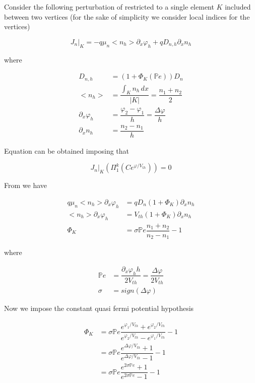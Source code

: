 Consider  the following perturbation of  restricted to a single element $K$ included between two vertices (for the sake of simplicity we consider local indices for the vertices)

\begin{equation}
\label{eq: j element 1d perturbata}
J_n|_K = -q\mu_n <n_h> \partial_x \varphi_h + qD_{n,h} \partial_x n_h
\end{equation}
 
 where 

\begin{align*}
D_{n,h} & = (1+\Phi_K(\mathbb{P}e))D_n \\
<n_h> & = \dfrac{\int_K n_h \, dx}{|K|} = \dfrac{n_1+n_2}{2} \\
\partial_x \varphi_h & = \dfrac{\varphi_2-\varphi_1}{h} = \dfrac{\Delta \varphi}{h}\\
\partial_x n_h & = \dfrac{n_2 - n_1}{h}
\end{align*}

Equation  can be obtained imposing that

\begin{equation}
J_n|_K(\Pi_1^k(Ce^{\varphi / V_{th}})) = 0 
\end{equation}

From  we have

\begin{align*}
q\mu_n <n_h>\partial_x \varphi_h & = q D_ n(1+\Phi_K)\partial_x n_h \\
<n_h>\partial_x \varphi_h & = V_{th}(1+\Phi_K)\partial_x n_h \\
\Phi_K & = \sigma \mathbb{P}e \dfrac{n_1+n_2}{n_2-n_1}  -1
\end{align*}

where 

\begin{align*}
\mathbb{P}e & = \dfrac{\partial_x \varphi_h h}{2V_{th}}  = \dfrac{\Delta \varphi }{2 V_{th}} \\
\sigma & = sign(\Delta \varphi)
\end{align*}


Now we impose the constant quasi fermi potential hypothesis

\begin{align*}
\Phi_K & = \sigma \mathbb{P}e \dfrac{e^{\varphi_1/V_{th}}+e^{\varphi_2/V_{th}}}{e^{\varphi_2/V_{th}}-e^{\varphi_1/V_{th}}} -1 \\
& = \sigma \mathbb{P}e \dfrac{e^{\Delta \varphi/V_{th}}+1}{e^{\Delta \varphi/V_{th}}-1} -1 \\
& = \sigma \mathbb{P}e \dfrac{e^{2 \sigma \mathbb{P}e}+1}{e^{2\sigma \mathbb{P}e}-1} -1
\end{align*}

